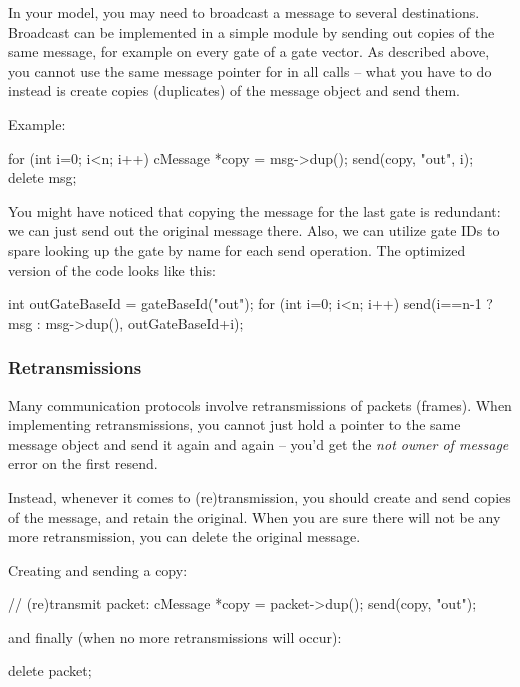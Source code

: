 In your model, you may need to broadcast a message to several destinations.
Broadcast can be implemented in a simple module by sending out copies
of the same message, for example on every gate of a gate vector.
As described above, you cannot use the same message pointer for
in all  calls -- what you have to do instead is
create copies (duplicates) of the message object and send them.

Example:

\begin{cpp}
for (int i=0; i<n; i++)
{
    cMessage *copy = msg->dup();
    send(copy, "out", i);
}
delete msg;
\end{cpp}

You might have noticed that copying the message for the last gate is
redundant: we can just send out the original message there.
Also, we can utilize gate IDs to spare looking up the gate by name
for each send operation. The optimized version of the code looks
like this:

\begin{cpp}
int outGateBaseId = gateBaseId("out");
for (int i=0; i<n; i++)
    send(i==n-1 ? msg : msg->dup(), outGateBaseId+i);
\end{cpp}


\subsubsection{Retransmissions}

Many communication protocols involve retransmissions of packets (frames).
When implementing retransmissions, you cannot just hold a pointer
to the same message object and send it again and again -- you'd get
the \textit{not owner of message} error on the first resend.

Instead, whenever it comes to (re)transmission, you should create and
send copies of the message, and retain the original.
When you are sure there will not be any more retransmission,
you can delete the original message.

Creating and sending a copy:

\begin{cpp}
// (re)transmit packet:
cMessage *copy = packet->dup();
send(copy, "out");
\end{cpp}

and finally (when no more retransmissions will occur):

\begin{cpp}
delete packet;
\end{cpp}


